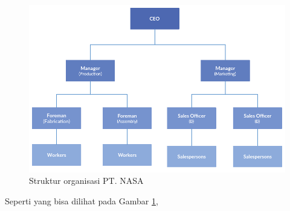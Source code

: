 \begin{figure} [ht] \centering
  \includegraphics[scale=0.4]{gambar/organization-structure.png}
  \caption{Struktur organisasi PT. NASA}
  \label{fig:OrganizationStructure}
\end{figure}

Seperti yang bisa dilihat pada Gambar \ref{fig:OrganizationStructure}, \lipsum[15]

